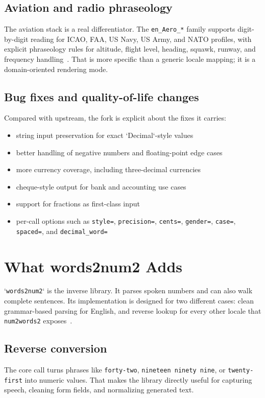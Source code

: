 \documentclass{article}
\begin{document}
\subsection{Aviation and radio phraseology}
The aviation stack is a real differentiator. The \texttt{en\_Aero\_*} family supports
digit-by-digit reading for ICAO, FAA, US Navy, US Army, and NATO profiles,
with explicit phraseology rules for altitude, flight level, heading, squawk,
runway, and frequency handling~\cite{num2words2_reference}. That is more
specific than a generic locale mapping; it is a domain-oriented rendering mode.

\subsection{Bug fixes and quality-of-life changes}
Compared with upstream, the fork is explicit about the fixes it carries:
\begin{itemize}
  \item string input preservation for exact `Decimal`-style values
  \item better handling of negative numbers and floating-point edge cases
  \item more currency coverage, including three-decimal currencies
  \item cheque-style output for bank and accounting use cases
  \item support for fractions as first-class input
  \item per-call options such as \texttt{style=}, \texttt{precision=}, \texttt{cents=},
        \texttt{gender=}, \texttt{case=}, \texttt{spaced=}, and \texttt{decimal\_word=}
\end{itemize}

\section{What words2num2 Adds}
`\texttt{words2num2}` is the inverse library. It parses spoken numbers and can also walk
complete sentences. Its implementation is designed for two different cases:
clean grammar-based parsing for English, and reverse lookup for every other
locale that \texttt{num2words2} exposes~\cite{words2num2_readme}.

\subsection{Reverse conversion}
The core call turns phrases like \texttt{forty-two}, \texttt{nineteen ninety nine}, or
\texttt{twenty-first} into numeric values. That makes the library directly useful for
capturing speech, cleaning form fields, and normalizing generated text.
\end{document}
